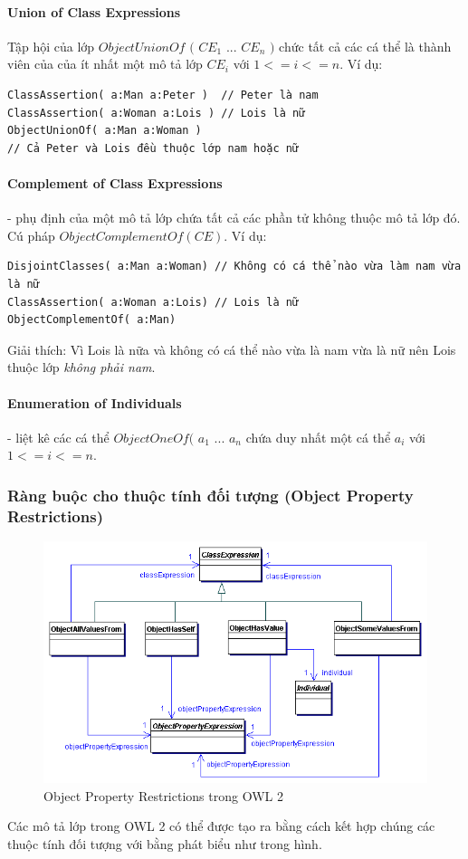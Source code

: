 \paragraph{Union of Class Expressions} Tập hội của lớp $ObjectUnionOf$ $($ $CE_{1}$ ... $CE_{n}$ $)$ chức tất cả các cá thể là thành viên của của ít nhất một mô tả lớp $CE_{i}$ với $1<=i<=n$. Ví dụ:
\begin{verbatim}
ClassAssertion( a:Man a:Peter )	 // Peter là nam
ClassAssertion( a:Woman a:Lois ) // Lois là nữ
ObjectUnionOf( a:Man a:Woman ) 
// Cả Peter và Lois đều thuộc lớp nam hoặc nữ
\end{verbatim}

\paragraph{Complement of Class Expressions} - phụ định của một mô tả lớp chứa tất cả các phần tử không thuộc mô tả lớp đó. Cú pháp $ObjectComplementOf(CE)$. Ví dụ:
\begin{verbatim}
DisjointClasses( a:Man a:Woman) // Không có cá thể nào vừa làm nam vừa là nữ
ClassAssertion( a:Woman a:Lois) // Lois là nữ
ObjectComplementOf( a:Man)
\end{verbatim}
Giải thích: Vì Lois là nữa và không có cá thể nào vừa là nam vừa là nữ nên Lois thuộc lớp \textit{không phải nam}.

\paragraph{Enumeration of Individuals} - liệt kê các cá thể $ObjectOneOf($ $a_{1}$ ... $a_{n}$ chứa duy nhất một cá thể $a_{i}$ với $1<=i<=n$. 

\subsubsection{Ràng buộc cho thuộc tính đối tượng (Object Property Restrictions)}
\begin{figure}[h]
	\centering
	\includegraphics[width=120mm]{Figures/ce_1.png}
	\caption{Object Property Restrictions trong OWL 2\label{overflow}}
\end{figure}
Các mô tả lớp trong OWL 2 có thể được tạo ra bằng cách kết hợp chúng các thuộc tính đối tượng với bằng phát biểu như trong hình.
